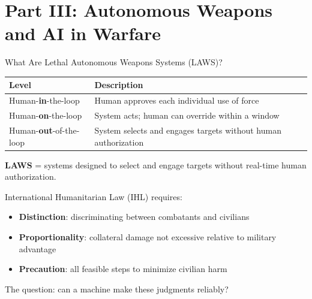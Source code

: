 \documentclass[aspectratio=169,11pt]{beamer}
\begin{document}
\section{Part III: Autonomous Weapons and AI in Warfare}

\begin{frame}[shrink=17]{What Are Lethal Autonomous Weapons Systems (LAWS)?}
\begin{conceptbox}
\small
\begin{tabular}{@{}p{3.8cm}p{7.2cm}@{}}
\toprule
\textbf{Level} & \textbf{Description} \\
\midrule
Human-\textbf{in}-the-loop & Human approves each individual use of force \\
Human-\textbf{on}-the-loop & System acts; human can override within a window \\
Human-\textbf{out}-of-the-loop & System selects and engages targets without human authorization \\
\bottomrule
\end{tabular}

\vspace{0.15cm}
\textbf{LAWS} = systems designed to select and engage targets without real-time human authorization.
\end{conceptbox}

\vspace{0.2cm}
International Humanitarian Law (IHL) requires:
\begin{itemize}
    \item \textbf{Distinction}: discriminating between combatants and civilians
    \item \textbf{Proportionality}: collateral damage not excessive relative to military advantage
    \item \textbf{Precaution}: all feasible steps to minimize civilian harm
\end{itemize}

The question: can a machine make these judgments reliably? \parencite{scharre_army_of_none_2018}
\end{frame}
\end{document}
